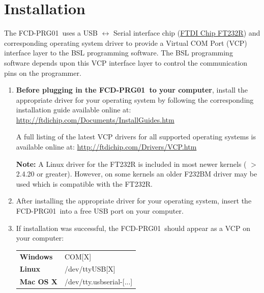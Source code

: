 \documentclass[10pt,letterpaper]{datasheet}
\newcommand{\PID}{FCD-PRG01}
\begin{document}
\section*{Installation}
\begin{flushleft}
  The \PID\ uses a USB $\leftrightarrow$ Serial interface chip (\href{http://ftdichip.com/Products/FT232R.htm}{FTDI Chip FT232R}) and corresponding operating system driver to provide a Virtual COM Port (VCP) interface layer to the BSL programming software.  The BSL programming software depends upon this VCP interface layer to control the communication pins on the programmer.\\
  \begin{enumerate}
    \item \textbf{Before plugging in the \PID\ to your computer}, install the appropriate driver for your operating system by following the corresponding installation guide available online at: \newline
    \href{http://ftdichip.com/Documents/InstallGuides.htm}{http://ftdichip.com/Documents/InstallGuides.htm} \newline

    A full listing of the latest VCP drivers for all supported operating systems is available online at: \newline \href{http://ftdichip.com/Drivers/VCP.htm}{http://ftdichip.com/Drivers/VCP.htm} \newline

    \textbf{Note:} A Linux driver for the FT232R is included in most newer kernels ( $>$ 2.4.20 or greater).  However, on some kernels an older F232BM driver may be used which is compatible with the FT232R.  \newline

    \item After installing the appropriate driver for your operating system, insert the \PID\ into a free USB port on your computer.

    \item If installation was successful, the \PID\ should appear as a VCP on your computer:
    
    \label{tab:elec-io}
    \begin{tabular}{l l}
      \textbf{Windows} & COM[X] \\
      \textbf{Linux} & /dev/ttyUSB[X] \\
      \textbf{Mac OS X} & /dev/tty.usbserial-[...] \\
    \end{tabular}
  \end{enumerate}
\end{flushleft}
\end{document}
